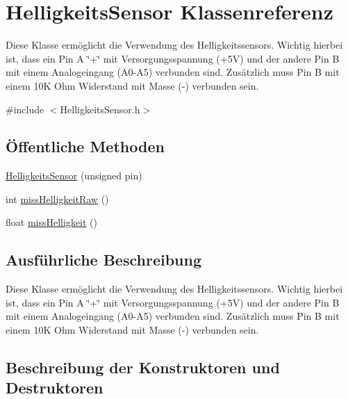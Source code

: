 \hypertarget{classHelligkeitsSensor}{}\section{Helligkeits\+Sensor Klassenreferenz}
\label{classHelligkeitsSensor}


Diese Klasse ermöglicht die Verwendung des Helligkeitssensors. Wichtig hierbei ist, dass ein Pin A \char`\"{}+\char`\"{} mit Versorgungsspannung (+5V) und der andere Pin B mit einem Analogeingang (A0-\/\+A5) verbunden sind. Zusätzlich muss Pin B mit einem 10K Ohm Widerstand mit Masse (-\/) verbunden sein.  




{\ttfamily \#include $<$Helligkeits\+Sensor.\+h$>$}

\subsection*{Öffentliche Methoden}
\begin{DoxyCompactItemize}
\item 
\hyperlink{classHelligkeitsSensor_a4154c5c9a77f4035b94602252f573f41}{Helligkeits\+Sensor} (unsigned pin)
\item 
int \hyperlink{classHelligkeitsSensor_adabf39eb12ed5b5be57c8d3a382cf99b}{miss\+Helligkeit\+Raw} ()
\item 
float \hyperlink{classHelligkeitsSensor_ad69b97f09e9b4ff9597ede2670c08f2c}{miss\+Helligkeit} ()
\end{DoxyCompactItemize}


\subsection{Ausführliche Beschreibung}
Diese Klasse ermöglicht die Verwendung des Helligkeitssensors. Wichtig hierbei ist, dass ein Pin A \char`\"{}+\char`\"{} mit Versorgungsspannung (+5V) und der andere Pin B mit einem Analogeingang (A0-\/\+A5) verbunden sind. Zusätzlich muss Pin B mit einem 10K Ohm Widerstand mit Masse (-\/) verbunden sein. 

\subsection{Beschreibung der Konstruktoren und Destruktoren}

